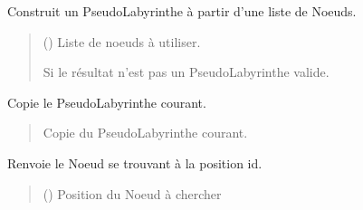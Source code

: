 \documentclass[letterpaper,10pt,french]{sphinxmanual}
\begin{document}
\begin{fulllineitems}
\begin{fulllineitems}
\label{\detokenize{src:src.utilites.PseudoLabyrinthe.construit}}
\pysigstartsignatures
{}
\pysigstopsignatures
\sphinxAtStartPar
Construit un PseudoLabyrinthe à partir d’une liste de Noeuds.
\begin{quote}\begin{description}
\sphinxAtStartPar
{} () \textendash{} Liste de noeuds à utiliser.

\sphinxAtStartPar
{} \textendash{} Si le résultat n’est pas un PseudoLabyrinthe valide.

\end{description}\end{quote}

\end{fulllineitems}


\begin{fulllineitems}
\label{\detokenize{src:src.utilites.PseudoLabyrinthe.copie}}
\pysigstartsignatures
{}
\pysigstopsignatures
\sphinxAtStartPar
Copie le PseudoLabyrinthe courant.
\begin{quote}\begin{description}
\sphinxAtStartPar
Copie du PseudoLabyrinthe courant.

\sphinxAtStartPar
{\hyperref[\detokenize{src:src.utilites.PseudoLabyrinthe}]{}}

\end{description}\end{quote}

\end{fulllineitems}


\begin{fulllineitems}
\label{\detokenize{src:src.utilites.PseudoLabyrinthe.get_noeud_par_id}}
\pysigstartsignatures
{}
\pysigstopsignatures
\sphinxAtStartPar
Renvoie le Noeud se trouvant à la position id.
\begin{quote}\begin{description}
\sphinxAtStartPar
{} () \textendash{} Position du Noeud à chercher


\end{description}
\end{quote}
\end{fulllineitems}
\end{fulllineitems}
\end{document}
